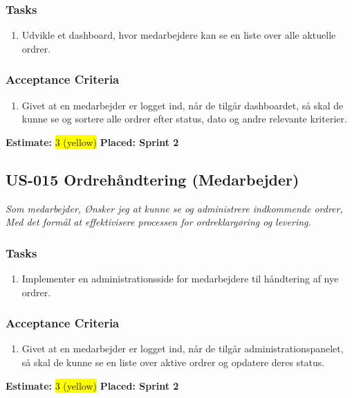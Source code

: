 \subsubsection*{\textbf{Tasks}}
\begin{enumerate}
  \item Udvikle et dashboard, hvor medarbejdere kan se en liste over alle aktuelle ordrer.
\end{enumerate}
\subsubsection*{\textbf{Acceptance Criteria}}
\begin{enumerate}
  \item Givet at en medarbejder er logget ind, når de tilgår dashboardet, så skal de kunne se og sortere alle ordrer efter status, dato og andre relevante kriterier.
\end{enumerate}
\textbf{Estimate:} \colorbox{yellow}{3 (yellow)}
\textbf{Placed: Sprint 2}
\par\noindent\dotfill

\subsection{US-015 Ordrehåndtering (Medarbejder)}
\label{sec:US-015}
\textit{Som medarbejder, Ønsker jeg at kunne se og administrere indkommende ordrer, Med det formål at effektivisere processen for ordreklargøring og levering.}
\subsubsection*{\textbf{Tasks}}
\begin{enumerate}
  \item Implementer en administrationsside for medarbejdere til håndtering af nye ordrer.
\end{enumerate}
\subsubsection*{\textbf{Acceptance Criteria}}
\begin{enumerate}
  \item Givet at en medarbejder er logget ind, når de tilgår administrationspanelet, så skal de kunne se en liste over aktive ordrer og opdatere deres status.
\end{enumerate}
\textbf{Estimate:} \colorbox{yellow}{3 (yellow)}
\textbf{Placed: Sprint 2}
\par\noindent\dotfill

